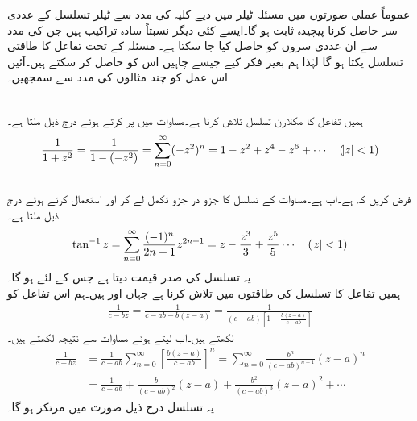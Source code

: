 عموماً عملی صورتوں میں مسئلہ ٹیلر میں دیے کلیہ کی مدد سے  ٹیلر تسلسل کے عددی سر  حاصل کرنا پیچیدہ ثابت ہو گا۔ایسے کئی دیگر نسبتاً سادہ  تراکیب ہیں جن کی مدد سے ان عددی سروں کو حاصل کیا جا سکتا ہے۔ مسئلہ  کے تحت تفاعل کا طاقتی تسلسل یکتا ہو گا لہٰذا ہم بغیر فکر کیے جیسے چاہیں اس کو حاصل کر سکتے ہیں۔آئیں اس عمل کو چند مثالوں کی مدد سے سمجھیں۔

\quad {}\\
ہمیں تفاعل  کا مکلارن تسلسل تلاش کرنا ہے۔مساوات  میں  پر کرتے ہوئے  درج ذیل ملتا ہے۔
\begin{align}\label{مساوات_ٹیلر_عملی_تراکیب_الف}
\frac{1}{1+z^2}=\frac{1}{1-(-z^2)}=\sum\limits_{n=0}^{\infty} (-z^2)^n =1-z^2+z^4-z^6+\cdots \quad (\abs{z}<1)
\end{align}
  \quad {}\\
فرض کریں کہ  ہے۔اب  ہے۔مساوات  کے تسلسل کا جزو در جزو تکمل لے کر اور  استعمال کرتے ہوئے درج ذیل ملتا ہے۔
\begin{align*}
\tan^{-1}z=\sum\limits_{n=0}^{\infty} \frac{(-1)^n}{2n+1}z^{2n+1}=z-\frac{z^3}{3}+\frac{z^5}{5}\cdots\quad (\abs{z}<1)
\end{align*}
یہ تسلسل   کی صدر قیمت دیتا ہے جس کے لئے  ہو گا۔
\quad {}\\
ہمیں تفاعل  کا تسلسل  کی طاقتوں میں تلاش کرنا ہے جہاں  اور  ہیں۔ہم اس تفاعل کو 
\begin{align*}
\frac{1}{c-bz}=\frac{1}{c-ab-b(z-a)}=\frac{1}{(c-ab)[1-\tfrac{b(z-a)}{c-ab}]}
\end{align*}
لکھتے ہیں۔اب  لیتے ہوئے مساوات  سے نتیجہ لکھتے ہیں۔
\begin{align*}
\frac{1}{c-bz}&=\frac{1}{c-ab}\sum\limits_{n=0}^{\infty}[\frac{b(z-a)}{c-ab}]^n=\sum\limits_{n=0}^{\infty} \frac{b^n}{(c-ab)^{n+1}}(z-a)^n\\
&=\frac{1}{c-ab}+\frac{b}{(c-ab)^2}(z-a)+\frac{b^2}{(c-ab)^3}(z-a)^2+\cdots
\end{align*}
یہ تسلسل درج ذیل صورت میں مرتکز ہو گا۔

